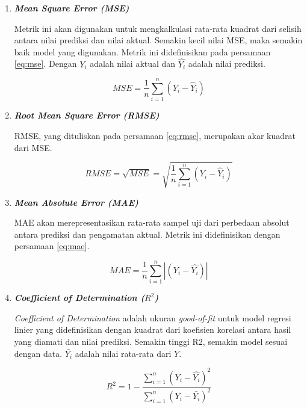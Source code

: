 \begin{enumerate}
    \item \textbf{\textit{Mean Square Error (MSE)}}
    
    Metrik ini akan digunakan untuk mengkalkulasi rata-rata kuadrat dari selisih antara nilai prediksi dan nilai aktual. Semakin kecil nilai MSE, maka semakin baik model yang digunakan. Metrik ini didefinisikan pada persamaan \ref{eq:mse}. Dengan $Y_i$ adalah nilai aktual dan $\hat{Y_i}$ adalah nilai prediksi.

    \begin{equation}
        \label{eq:mse}
        MSE = \frac{1}{n}\sum_{i=1}^{n}(Y_i-\hat{Y}_i)
    \end{equation}

    \item \textbf{\textit{Root Mean Square Error (RMSE)}}
    
    RMSE, yang dituliskan pada persamaan \ref{eq:rmse}, merupakan akar kuadrat dari MSE.
    
    \begin{equation}
        \label{eq:rmse}
        RMSE = \sqrt{MSE} = \sqrt{\frac{1}{n}\sum_{i=1}^{n}(Y_i-\hat{Y}_i)}
    \end{equation}
    
    \item \textbf{\textit{Mean Absolute Error (MAE)}}
    
    MAE akan merepresentasikan rata-rata sampel uji dari perbedaan absolut antara prediksi dan pengamatan aktual. Metrik ini didefinisikan dengan persamaan \ref{eq:mae}.

    \begin{equation}
        \label{eq:mae}
        MAE = \frac{1}{n}\sum_{i=1}^{n}|(Y_i-\hat{Y_i})|
    \end{equation}

    \item \textbf{\textit{Coefficient of Determination ($R^{2}$)}}
    
    \textit{Coefficient of Determination} adalah ukuran \textit{good-of-fit} untuk model regresi linier yang didefinisikan dengan kuadrat dari koefisien korelasi antara hasil yang diamati dan nilai prediksi. Semakin tinggi R2, semakin model sesuai dengan data. $\bar{Y_i}$ adalah nilai rata-rata dari $Y$.
    
    \begin{equation}
        \label{eq:r2}
        R^{2} = 1-\frac{\sum_{i=1}^{n}(Y_i-\hat{Y_i})^{2}}{\sum_{i=1}^{n}(Y_i-\bar{Y_i})^{2}}
    \end{equation}
\end{enumerate}

